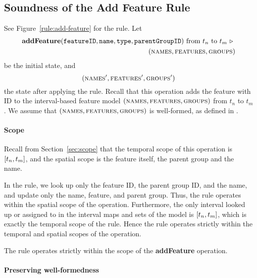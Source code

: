 \subsection{Soundness of the Add Feature Rule}
\label{sub:soundness-of-the-add-feature-rule}

See Figure~\vref{rule:add-feature} for the  rule.
Let 
\begin{equation*}
   \begin{split}
      \textbf{addFeature}(\texttt{featureID}, \texttt{name}, \texttt{type}, \texttt{parentGroupID})\text{ from } t_n \text{ to } t_m
      \ \triangleright \  \\
   (\textsc{names}{}, \textsc{features}{}, \textsc{groups}{}{})
\end{split}
\end{equation*}
be the initial state, and
\[
   (\textsc{names}', \textsc{features}', \textsc{groups}{}')
\]
the state after applying the  rule.  Recall that this operation adds the feature with ID  to the interval-based feature model $(\textsc{names}{}, \textsc{features}{}, \textsc{groups}{}{})$ from $t_n$ to $t_m$. We assume that $(\textsc{names}{}, \textsc{features}{}, \textsc{groups}{}{})$ is well-formed, as defined in .

\paragraph{Scope}

Recall from Section~\vref{sec:scope} that the temporal scope of this operation is $\interval{t_n}{t_m}$, and the spatial scope is the feature itself, the parent group and the name. 

In the rule, we look up only the feature ID, the parent group ID, and the name, and update only the name, feature, and parent group. Thus, the rule operates within the spatial scope of the operation. Furthermore, the only interval looked up or assigned to in the interval maps and sets of the model is $\interval{t_n}{t_m}$, which is exactly the temporal scope of the rule. Hence the rule operates strictly within the temporal and spatial scopes of the operation.
\\

\begin{lemma}
   The  rule operates strictly within the scope of the \textbf{addFeature} operation.
   \label{lemma:add-feature-scope}
\end{lemma}


\paragraph{Preserving well-formedness}

